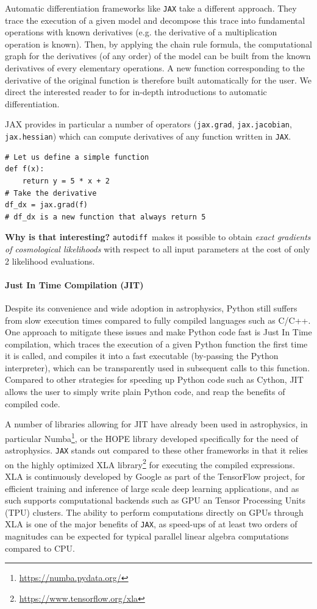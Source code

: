 \documentclass[twocolumn,twocolappendix,nofootinbib,iop]{openjournal}
\newcommand{\autodiff}{\texttt{autodiff}}
\begin{document}
Automatic differentiation frameworks like \texttt{JAX} take a different approach. They trace the execution of a given model and decompose this trace into fundamental operations with known derivatives (e.g. the derivative of a multiplication operation is known). Then, by applying the chain rule formula, the computational graph for the derivatives (of any order) of the model can be built from the known derivatives of every elementary operations. A new function corresponding to the derivative of the original function is therefore built automatically for the user. We direct the interested reader to \cite{baydin2018automatic, Margossian2019} for in-depth introductions to automatic differentiation. 

JAX provides in particular a number of operators (\texttt{jax.grad}, \texttt{jax.jacobian}, \texttt{jax.hessian}) which can compute derivatives of any function written in \texttt{JAX}.
\begin{lstlisting}[language=iPython]
# Let us define a simple function 
def f(x):
	return y = 5 * x + 2
# Take the derivative
df_dx = jax.grad(f)
# df_dx is a new function that always return 5 
\end{lstlisting}

\textbf{Why is that interesting?} \autodiff\ makes it possible to obtain \textit{exact gradients of cosmological likelihoods} with respect to all input parameters at the cost of only 2 likelihood evaluations.


\paragraph{\textbf{Just In Time Compilation (JIT)}} Despite its convenience and wide adoption in astrophysics, Python still suffers from slow execution times compared to fully compiled languages such as C/C++. One approach to mitigate these issues and make Python code fast is Just In Time compilation, which traces the execution of a given Python function the first time it is called, and compiles it into a fast executable (by-passing the Python interpreter), which can be transparently used in subsequent calls to this function. Compared to other strategies for speeding up Python code such as Cython, JIT allows the user to simply write plain Python code, and reap the benefits of compiled code.

A number of libraries allowing for JIT have already been used in astrophysics, in particular Numba\footnote{\url{https://numba.pydata.org/}}, or the HOPE library \cite{2015A&C....10....1A} developed specifically for the need of astrophysics. \texttt{JAX} stands out compared to these other frameworks in that it relies on the highly optimized XLA library\footnote{\url{https://www.tensorflow.org/xla}} for executing the compiled expressions. XLA is continuously developed by Google as part of the TensorFlow project, for efficient training and inference of large scale deep learning applications, and as such supports computational backends such as GPU an Tensor Processing Units (TPU) clusters. The ability to perform computations directly on GPUs through XLA is one of the major benefits of \texttt{JAX}, as speed-ups of at least two orders of magnitudes can be expected for typical parallel linear algebra computations compared to CPU.
\end{document}
